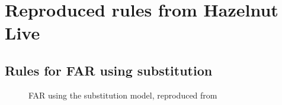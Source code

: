 \chapter{Reproduced rules from Hazelnut Live}
\label{chap:reproduced-hazelnut-live-rules}



\section{Rules for FAR using substitution}
\label{sec:far-substitution}

\begin{figure}
  \centering
  \begin{mdframed}
    \begin{singlespace}
      
    \end{singlespace}
  \end{mdframed}
  \caption{FAR using the substitution model, reproduced from \cite{conf/popl/HazelnutLive19}}
  \label{fig:far-substitution}
\end{figure}



